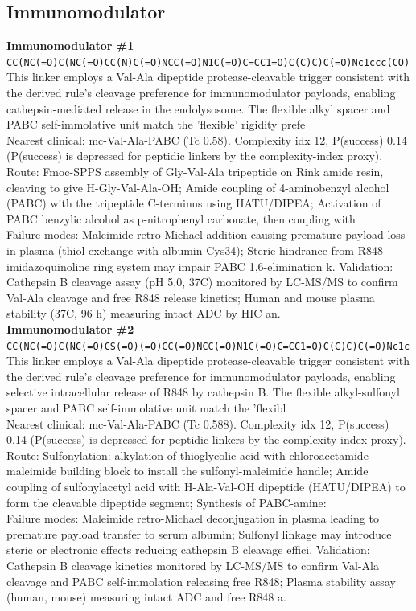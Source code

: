 \documentclass[10pt]{article}
\begin{document}
\subsection{Immunomodulator}
\noindent\textbf{Immunomodulator \#1} \\ \texttt{CC(NC(=O)C(NC(=O)CC(N)C(=O)NCC(=O)N1C(=O)C=CC1=O)C(C)C)C(=O)Nc1ccc(CO)} \\ This linker employs a Val-Ala dipeptide protease-cleavable trigger consistent with the derived rule's cleavage preference for immunomodulator payloads, enabling cathepsin-mediated release in the endolysosome. The flexible alkyl spacer and PABC self-immolative unit match the 'flexible' rigidity prefe \\ Nearest clinical: mc-Val-Ala-PABC (Tc 0.58). Complexity idx 12, P(success) 0.14 (P(success) is depressed for peptidic linkers by the complexity-index proxy). \\ Route: Fmoc-SPPS assembly of Gly-Val-Ala tripeptide on Rink amide resin, cleaving to give H-Gly-Val-Ala-OH; Amide coupling of 4-aminobenzyl alcohol (PABC) with the tripeptide C-terminus using HATU/DIPEA; Activation of PABC benzylic alcohol as p-nitrophenyl carbonate, then coupling with  \\ Failure modes: Maleimide retro-Michael addition causing premature payload loss in plasma (thiol exchange with albumin Cys34); Steric hindrance from R848 imidazoquinoline ring system may impair PABC 1,6-elimination k. Validation: Cathepsin B cleavage assay (pH 5.0, 37\textdegree{}C) monitored by LC-MS/MS to confirm Val-Ala cleavage and free R848 release kinetics; Human and mouse plasma stability (37\textdegree{}C, 96 h) measuring intact ADC by HIC an. \\[0.4em]
\noindent\textbf{Immunomodulator \#2} \\ \texttt{CC(NC(=O)C(NC(=O)CS(=O)(=O)CC(=O)NCC(=O)N1C(=O)C=CC1=O)C(C)C)C(=O)Nc1c} \\ This linker employs a Val-Ala dipeptide protease-cleavable trigger consistent with the derived rule's cleavage preference for immunomodulator payloads, enabling selective intracellular release of R848 by cathepsin B. The flexible alkyl-sulfonyl spacer and PABC self-immolative unit match the 'flexibl \\ Nearest clinical: mc-Val-Ala-PABC (Tc 0.588). Complexity idx 12, P(success) 0.14 (P(success) is depressed for peptidic linkers by the complexity-index proxy). \\ Route: Sulfonylation: alkylation of thioglycolic acid with chloroacetamide-maleimide building block to install the sulfonyl-maleimide handle; Amide coupling of sulfonylacetyl acid with H-Ala-Val-OH dipeptide (HATU/DIPEA) to form the cleavable dipeptide segment; Synthesis of PABC-amine:  \\ Failure modes: Maleimide retro-Michael deconjugation in plasma leading to premature payload transfer to serum albumin; Sulfonyl linkage may introduce steric or electronic effects reducing cathepsin B cleavage effici. Validation: Cathepsin B cleavage kinetics monitored by LC-MS/MS to confirm Val-Ala cleavage and PABC self-immolation releasing free R848; Plasma stability assay (human, mouse) measuring intact ADC and free R848 a. \\[0.4em]
\end{document}

